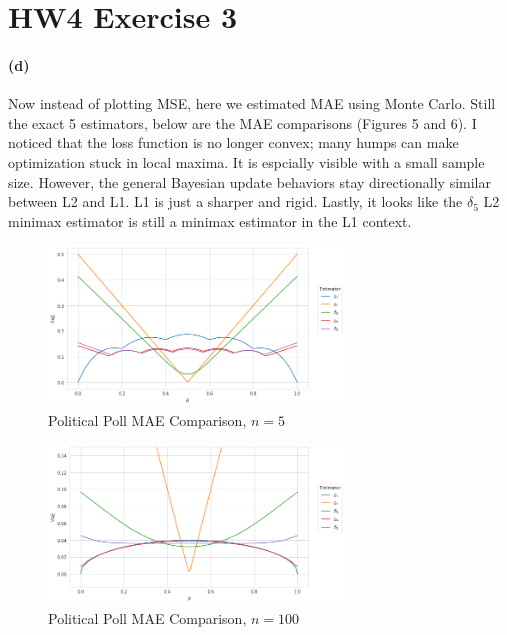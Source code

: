 \documentclass[11pt, letterpaper]{article}
\author{Ryan Tang}
\date{October 7th 2022}
\begin{document}
\maketitle

\section{HW4 Exercise 3}
\paragraph{(d)}
Now instead of plotting MSE, here we estimated MAE using Monte Carlo. Still the exact 5 estimators, below are the MAE comparisons (Figures 5 and 6). I noticed that the loss function is no longer convex; many humps can make optimization stuck in local maxima. It is espcially visible with a small sample size. However, the general Bayesian update behaviors stay directionally similar between L2 and L1. L1 is just a sharper and rigid. Lastly, it looks like the $\delta_5$ L2 minimax estimator is still a minimax estimator in the L1 context.
\begin{figure}[!h]
  \centering
  \includegraphics[width=0.7\textwidth]{3.d.1.png}
  \captionsetup{justification=centering}
  \caption{Political Poll MAE Comparison, $n = 5$}
\end{figure}

\begin{figure}[!h]
  \centering
  \includegraphics[width=0.7\textwidth]{3.d.2.png}
  \captionsetup{justification=centering}
  \caption{Political Poll MAE Comparison, $n = 100$}
\end{figure}
\end{document}
